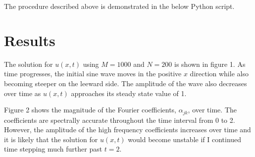 \documentclass[12pt]{article}
\newcommand{\pythonscript}[2]{\begin{itemize}
                              \item[]
                              \end{itemize}}
\begin{document}
The procedure described above is demonstrated in the below Python script.

\section*{Results}
The solution for $u(x,t)$ using $M=1000$ and $N=200$ is shown in
figure 1.  As time progresses, the initial sine wave moves in the
positive $x$ direction while also becoming steeper on the leeward
side.  The amplitude of the wave also decreases over time as $u(x,t)$
approaches its steady state value of 1.      

Figure 2 shows the magnitude of the Fourier coefficients,
$\alpha_{jk}$, over time.  The coefficients are spectrally accurate
throughout the time interval from 0 to 2.  However, the amplitude of
the high frequency coefficients increases over time and it is likely
that the solution for $u(x,t)$ would become unstable if I continued
time stepping much further past $t=2$.
\end{document}
